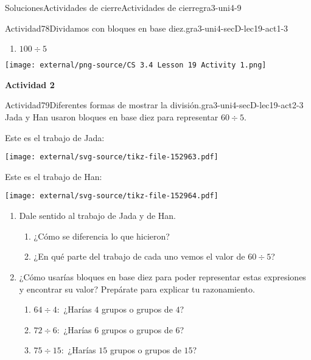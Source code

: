 \documentclass[twoside,10pt,]{article}
\begin{document}
\begin{solutions-section}{Soluciones}{Actividades de cierre}{}{Actividades de cierre}{}{}{gra3-uni4-9}
\begin{activitysolution}{Actividad}{78}{Dividamos con bloques en base diez.}{gra3-uni4-secD-lec19-act1-3}
\begin{sidebyside}{2}{0}{0.1}{0}
\begin{sbspanel}{0.7}
\begin{enumerate}
\begin{enumerate}
\item{}\(\displaystyle 100 \div 5\)%
\end{enumerate}
\end{enumerate}
\end{sbspanel}%
\begin{sbspanel}{0.2}%
\texttt{[image: external/png-source/CS 3.4 Lesson 19 Activity 1.png]}
\end{sbspanel}%
\end{sidebyside}%
\end{activitysolution}%
\par\medskip
\noindent\textbf{\large{}\space\textperiodcentered\space{}Actividad 2}
\begin{activitysolution}{Actividad}{79}{Diferentes formas de mostrar la división.}{gra3-uni4-secD-lec19-act2-3}%
Jada y Han usaron bloques en base diez para representar \(60 \div 5\).%
\par
Este es el trabajo de Jada:%
\begin{image}{0}{1}{0}{}%
\texttt{[image: external/svg-source/tikz-file-152963.pdf]}
\end{image}%
Este es el trabajo de Han:%
\begin{image}{0}{1}{0}{}%
\texttt{[image: external/svg-source/tikz-file-152964.pdf]}
\end{image}%
%
\begin{enumerate}
\item{}Dale sentido al trabajo de Jada y de Han.%
%
\begin{enumerate}
\item{}¿Cómo se diferencia lo que hicieron?%
\item{}¿En qué parte del trabajo de cada uno vemos el valor de \(60 \div 5\)?%
\end{enumerate}
\item{}¿Cómo usarías bloques en base diez para poder representar estas expresiones y encontrar su valor? Prepárate para explicar tu razonamiento.%
%
\begin{enumerate}
\item{}\(64 \div 4:\) ¿Harías \(4\) grupos o grupos de \(4\)?%
\item{}\(72 \div 6:\) ¿Harías \(6\) grupos o grupos de \(6\)?%
\item{}\(75 \div 15:\) ¿Harías \(15\) grupos o grupos de \(15\)?%
\end{enumerate}
\end{enumerate}
\end{activitysolution}%

\end{solutions-section}
\end{document}
